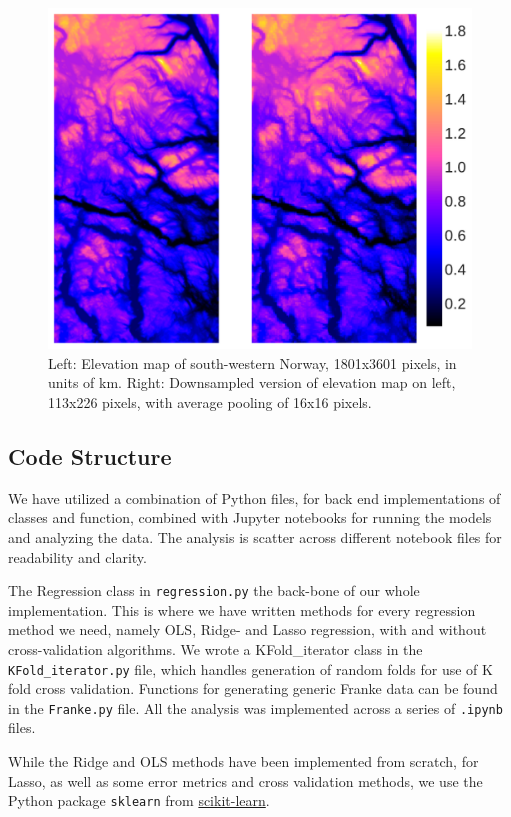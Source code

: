 \documentclass[10pt, twocolumn]{article}
\begin{document}
\begin{figure}[h!]
    \centering
    \includegraphics[scale=0.4]{../figs/Terrain.pdf}
    \caption{Left: Elevation map of south-western Norway, 1801x3601 pixels, in units of km. Right: Downsampled version of elevation map on left, 113x226 pixels, with average pooling of 16x16 pixels.}
    \label{fig:Terrain}
\end{figure}

\subsection{Code Structure}
We have utilized a combination of Python files, for back end implementations of classes and function, combined with Jupyter notebooks for running the models and analyzing the data. The analysis is scatter across different notebook files for readability and clarity.

The Regression class in \texttt{regression.py} the back-bone of our whole implementation. This is where we have written methods for every regression method we need, namely OLS, Ridge- and Lasso regression, with and without cross-validation algorithms. We wrote a KFold\_iterator class in the \texttt{KFold\_iterator.py} file, which handles generation of random folds for use of K fold cross validation. Functions for generating generic Franke data can be found in the \texttt{Franke.py} file. All the analysis was implemented across a series of \texttt{.ipynb} files.

While the Ridge and OLS methods have been implemented from scratch, for Lasso, as well as some error metrics and cross validation methods, we use the Python package \texttt{sklearn} from \href{https://scikit-learn.org/stable/documentation.html}{scikit-learn}.
\end{document}
